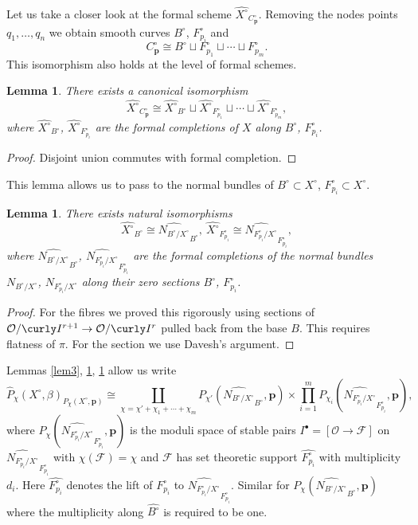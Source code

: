 \documentclass[12pt]{amsart}
\newtheorem{lemma}[theorem]{Lemma}
\theoremstyle{definition}
\theoremstyle{property}
\newcommand\I{\curly I}
\renewcommand\O{\mathcal O}
\newcommand\mdot{{\scriptscriptstyle\bullet}}
\newcommand\F{\mathcal F}
\newcommand\p{\mathbf{p}}
\renewcommand\_{^{}_}
\begin{document}
Let us take a closer look at the formal scheme $\widehat{X^\circ}_{C_{\p}^\circ}$. 
Removing the nodes points $q_1, \ldots, q_n$ we obtain smooth curves $B^{\circ}$, $F_{p_i}^{\circ}$ and
$$
C_{\p}^{\circ} \cong B^{\circ} \sqcup F_{p_1}^{\circ} \sqcup \cdots \sqcup F_{p_m}^{\circ}.
$$
This isomorphism also holds at the level of formal schemes.
\begin{lemma} \label{lem4}
There exists a canonical isomorphism
$$
\widehat{X^\circ}_{C_{\p}^\circ} \cong \widehat{X^{\circ}}_{B^{\circ}} \sqcup \widehat{X^\circ}_{F_{p_1}^{\circ}} \sqcup \cdots \sqcup \widehat{X^\circ}_{F_{p_m}^{\circ}},
$$
where $\widehat{X^{\circ}}_{B^{\circ}}$, $\widehat{X^\circ}_{F_{p_i}^{\circ}}$ are the formal completions of $X$ along $B^\circ$, $F_{p_i}^{\circ}$. 
\end{lemma}
\begin{proof}
Disjoint union commutes with formal completion.
\end{proof}

This lemma allows us to pass to the normal bundles of $B^\circ \subset X^\circ$, $F_{p_i}^{\circ} \subset X^\circ$.
\begin{lemma} \label{lem5}
There exists natural isomorphisms
$$
\widehat{X^{\circ}}_{B^{\circ}} \cong \widehat{N_{B^{\circ} / X^\circ}}_{B^\circ}, \ \widehat{X^{\circ}}_{F_{p_i}^{\circ}} \cong \widehat{N_{F_{p_i}^{\circ} / X^\circ}}_{F_{p_i}^\circ}, 
$$
where $\widehat{N_{B^{\circ} / X^\circ}}_{B^\circ}$, $\widehat{N_{F_{p_i}^{\circ} / X^\circ}}_{F_{p_i}^{\circ}}$ are the formal completions of the normal bundles $N_{B^\circ / X^\circ}$, $N_{F_{p_i}^{\circ} / X^\circ}$ along their zero sections $B^\circ$, $F_{p_i}^{\circ}$.
\end{lemma}
\begin{proof}
For the fibres we proved this rigorously using sections of $\O / \I^{r+1} \rightarrow \O / \I^{r}$ pulled back from the base $B$. This requires flatness of $\pi$. For the section we use Davesh's argument.
\end{proof}

Lemmas \ref{lem3}, \ref{lem4}, \ref{lem5} allow us write
$$
\widehat{P}_{\chi}(X^\circ,\beta)_{P_{\chi}(X^\circ,\p)} \cong \coprod_{\chi = \chi' + \chi_1 + \cdots + \chi_{m}} P_{\chi'}(\widehat{N_{B^{\circ} / X^\circ}}_{B^\circ}, \p) \times \prod_{i=1}^{m} P_{\chi_i}(\widehat{N_{F_{p_i}^{\circ} / X^\circ}}_{F_{p_i}^{\circ}},\p),
$$
where $P_{\chi}(\widehat{N_{F_{p_i}^{\circ} / X^\circ}}_{F_{p_i}^{\circ}}, \p)$ is the moduli space of stable pairs $I^\mdot = [\O \rightarrow \F]$ on $\widehat{N_{F_{p_i}^{\circ} / X^\circ}}_{F_{p_i}^{\circ}}$ with $\chi(\F) = \chi$ and $\F$ has set theoretic support $\widehat{F_{p_i}^{\circ}}$ with multiplicity $d_i$. Here $\widehat{F_{p_i}^{\circ}}$ denotes the lift of $F_{p_i}^\circ$ to $\widehat{N_{F_{p_i}^{\circ} / X^\circ}}_{F_{p_i}^{\circ}}$. Similar for $P_{\chi}(\widehat{N_{B^{\circ} / X^\circ}}_{B^{\circ}},\p)$ where the multiplicity along $\widehat{B^\circ}$ is required to be one.
\end{document}
